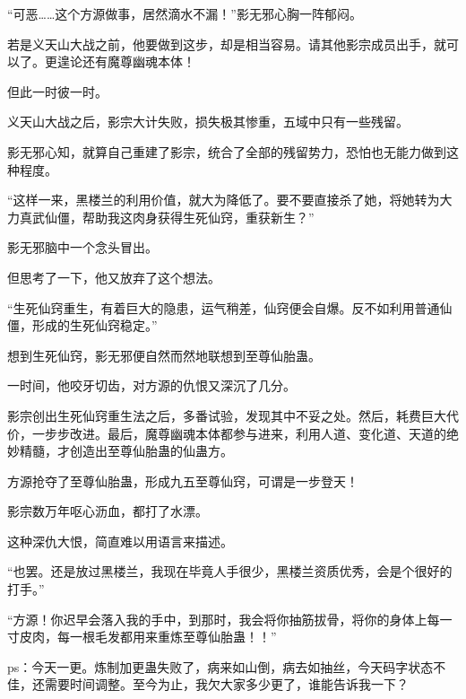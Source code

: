 \begin{this_body}
“可恶……这个方源做事，居然滴水不漏！”影无邪心胸一阵郁闷。

若是义天山大战之前，他要做到这步，却是相当容易。请其他影宗成员出手，就可以了。更遑论还有魔尊幽魂本体！

但此一时彼一时。

义天山大战之后，影宗大计失败，损失极其惨重，五域中只有一些残留。

影无邪心知，就算自己重建了影宗，统合了全部的残留势力，恐怕也无能力做到这种程度。

“这样一来，黑楼兰的利用价值，就大为降低了。要不要直接杀了她，将她转为大力真武仙僵，帮助我这肉身获得生死仙窍，重获新生？”

影无邪脑中一个念头冒出。

但思考了一下，他又放弃了这个想法。

“生死仙窍重生，有着巨大的隐患，运气稍差，仙窍便会自爆。反不如利用普通仙僵，形成的生死仙窍稳定。”

想到生死仙窍，影无邪便自然而然地联想到至尊仙胎蛊。

一时间，他咬牙切齿，对方源的仇恨又深沉了几分。

影宗创出生死仙窍重生法之后，多番试验，发现其中不妥之处。然后，耗费巨大代价，一步步改进。最后，魔尊幽魂本体都参与进来，利用人道、变化道、天道的绝妙精髓，才创造出至尊仙胎蛊的仙蛊方。

方源抢夺了至尊仙胎蛊，形成九五至尊仙窍，可谓是一步登天！

影宗数万年呕心沥血，都打了水漂。

这种深仇大恨，简直难以用语言来描述。

“也罢。还是放过黑楼兰，我现在毕竟人手很少，黑楼兰资质优秀，会是个很好的打手。”

“方源！你迟早会落入我的手中，到那时，我会将你抽筋拔骨，将你的身体上每一寸皮肉，每一根毛发都用来重炼至尊仙胎蛊！！”

ps：今天一更。炼制加更蛊失败了，病来如山倒，病去如抽丝，今天码字状态不佳，还需要时间调整。至今为止，我欠大家多少更了，谁能告诉我一下？

\end{this_body}


